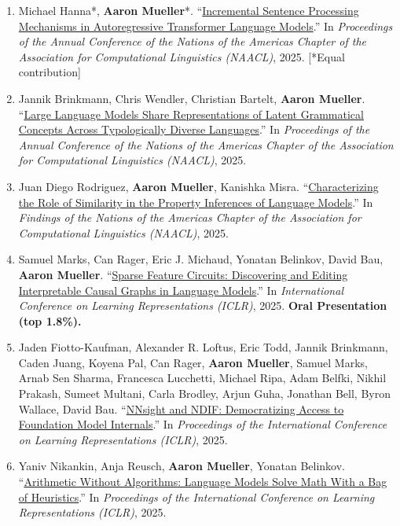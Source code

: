 \documentclass[10pt]{article}
\providecommand*\titlelink[2]{\href{#1}{\textcolor{accent}{#2}}}
\begin{document}
\begin{enumerate}[leftmargin=*, topsep=0pt, itemsep=0.25ex, partopsep=0ex, parsep=1ex, label=C\arabic*., ref=C\arabic*]
	\item Michael Hanna*, \textbf{Aaron Mueller}*. ``\titlelink{https://arxiv.org/abs/2412.05353}{Incremental Sentence Processing Mechanisms in Autoregressive Transformer Language Models}.'' In \emph{Proceedings of the Annual Conference of the Nations of the Americas Chapter of the Association for Computational Linguistics (NAACL)}, 2025. [*Equal contribution]\label{pub:garden-path-mech}
	
	\item Jannik Brinkmann, Chris Wendler, Christian Bartelt, \textbf{Aaron Mueller}. ``\titlelink{https://arxiv.org/abs/2501.06346}{Large Language Models Share Representations of Latent Grammatical Concepts Across Typologically Diverse Languages}.'' In \emph{Proceedings of the Annual Conference of the Nations of the Americas Chapter of the Association for Computational Linguistics (NAACL)}, 2025.\label{pub:multilingual-concepts}
	
	\item Juan Diego Rodriguez, \textbf{Aaron Mueller}, Kanishka Misra. ``\titlelink{https://arxiv.org/abs/2410.22590v1}{Characterizing the Role of Similarity in the Property Inferences of Language Models}.'' In \emph{Findings of the Nations of the Americas Chapter of the Association for Computational Linguistics (NAACL)}, 2025.\label{pub:property-inferences}
	
	\item Samuel Marks, Can Rager, Eric J. Michaud, Yonatan Belinkov, David Bau, \textbf{Aaron Mueller}. ``\titlelink{https://arxiv.org/abs/2403.19647}{Sparse Feature Circuits: Discovering and Editing Interpretable Causal Graphs in Language Models}.'' In \emph{International Conference on Learning Representations (ICLR)}, 2025. \textbf{\textcolor{accent}{Oral Presentation (top 1.8\%).}}\label{pub:feature-circuits}

	\item Jaden Fiotto-Kaufman, Alexander R. Loftus, Eric Todd, Jannik Brinkmann, Caden Juang, Koyena Pal, Can Rager, \textbf{Aaron Mueller}, Samuel Marks, Arnab Sen Sharma, Francesca Lucchetti, Michael Ripa, Adam Belfki, Nikhil Prakash, Sumeet Multani, Carla Brodley, Arjun Guha, Jonathan Bell, Byron Wallace, David Bau. ``\titlelink{https://arxiv.org/abs/2407.14561}{NNsight and NDIF: Democratizing Access to Foundation Model Internals}.'' In \emph{Proceedings of the International Conference on Learning Representations (ICLR)}, 2025.

	\item Yaniv Nikankin, Anja Reusch, \textbf{Aaron Mueller}, Yonatan Belinkov. ``\titlelink{https://arxiv.org/abs/2410.21272}{Arithmetic Without Algorithms: Language Models Solve Math With a Bag of Heuristics}.'' In \emph{Proceedings of the International Conference on Learning Representations (ICLR)}, 2025.\label{pub:math-boh}
	

\end{enumerate}
\end{document}
